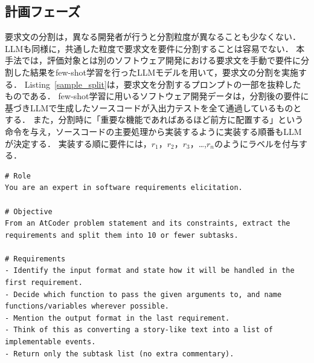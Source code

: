\documentclass[submit,techrep,noauthor]{ipsj}
\newcommand{\todo}[1]{\colorbox{yellow}{{\bf TODO}:}{\color{red} {\textbf{[#1]}}}}
\begin{document}



\subsection{計画フェーズ}
要求文の分割は，異なる開発者が行うと分割粒度が異なることも少なくない\cite{split_size}．LLMも同様に，共通した粒度で要求文を要件に分割することは容易でない．
本手法では，評価対象とは別のソフトウェア開発における要求文を手動で要件に分割した結果をfew-shot学習を行ったLLMモデルを用いて，要求文の分割を実施する．
Listing~\ref{sample_split}は，要求文を分割するプロンプトの一部を抜粋したものである．
few-shot学習に用いるソフトウェア開発データは，分割後の要件に基づきLLMで生成したソースコードが入出力テストを全て通過しているものとする．
また，分割時に「重要な機能であればあるほど前方に配置する」という命令を与え，ソースコードの主要処理から実装するように実装する順番もLLMが決定する．
実装する順に要件には，$r_1$，$r_2$，$r_3$，\dots,$r_n$のようにラベルを付与する．

\begin{lstlisting}[caption=要求分割のためのプロンプト（一部抜粋）, label=sample_split, captionpos=t, columns=fullflexible, breaklines=true]
# Role
You are an expert in software requirements elicitation.

# Objective
From an AtCoder problem statement and its constraints, extract the requirements and split them into 10 or fewer subtasks.

# Requirements
- Identify the input format and state how it will be handled in the first requirement.
- Decide which function to pass the given arguments to, and name functions/variables wherever possible.
- Mention the output format in the last requirement.
- Think of this as converting a story-like text into a list of implementable events.
- Return only the subtask list (no extra commentary).
\end{lstlisting}
\end{document}
